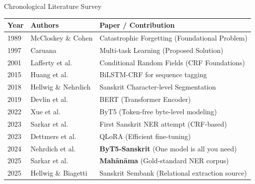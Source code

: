 \documentclass[10pt]{beamer}
\def\tpage{}
\newcommand{\tp}[1]{\def\tpage{#1}}
\begin{document}
\begin{frame}{Chronological Literature Survey}
    \tp{6}
    \centering
    \small
    \begin{tabular}{llp{7cm}}
        \toprule
        \textbf{Year} & \textbf{Authors} & \textbf{Paper / Contribution} \\
        \midrule
        1989 & McCloskey \& Cohen & Catastrophic Forgetting (Foundational Problem) \\
        1997 & Caruana & Multi-task Learning (Proposed Solution) \\
        2001 & Lafferty et al. & Conditional Random Fields (CRF Foundations) \\
        2015 & Huang et al. & BiLSTM-CRF for sequence tagging \\
        2018 & Hellwig \& Nehrdich & Sanskrit Character-level Segmentation \\
        2019 & Devlin et al. & BERT (Transformer Encoder) \\
        2022 & Xue et al. & ByT5 (Token-free byte-level modeling) \\
        2023 & Sarkar et al. & First Sanskrit NER attempt (CRF-based) \\
        2023 & Dettmers et al. & QLoRA (Efficient fine-tuning) \\
        2024 & Nehrdich et al. & \textbf{ByT5-Sanskrit} (One model is all you need) \\
        2025 & Sarkar et al. & \textbf{Mahānāma} (Gold-standard NER corpus) \\
        2025 & Hellwig \& Biagetti & Sanskrit Sembank (Relational extraction source) \\
        \bottomrule
    \end{tabular}
    \vfill
\end{frame}
\end{document}
